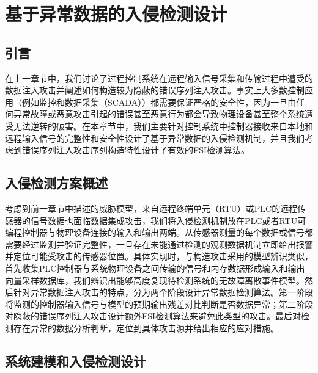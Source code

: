 
\chapter{基于异常数据的入侵检测设计}
\label{chap:data detection}

\section{引言}
\label{sec:intro}

在上一章节中，我们讨论了过程控制系统在远程输入信号采集和传输过程中遭受的数据注入攻击并阐述如何构造较为隐蔽的错误序列注入攻击。事实上大多数控制应用（例如监控和数据采集（SCADA））都需要保证严格的安全性，因为一旦由任何异常故障或恶意攻击引起的错误甚至恶意行为都会导致物理设备甚至整个系统遭受无法逆转的破害。在本章节中，我们主要针对控制系统中控制器接收来自本地和远程输入信号的完整性和安全性设计了基于异常数据的入侵检测机制，并且我们考虑到错误序列注入攻击序列构造特性设计了有效的FSI检测算法。

\section{入侵检测方案概述}
\label{sec:list}

考虑到前一章节中描述的威胁模型，来自远程终端单元（RTU）或PLC的远程传感器的信号数据也面临数据集成攻击，我们将入侵检测机制放在PLC或者RTU可编程控制器与物理设备连接的输入和输出两端。从传感器测量的每个数据或信号都需要经过监测并验证完整性，一旦存在未能通过检测的观测数据机制立即给出报警并定位可能受攻击的传感器位置。具体实现时，与构造攻击采用的模型辨识类似，首先收集PLC控制器与系统物理设备之间传输的信号和内存数据形成输入和输出向量采样数据库，我们辨识出能够高度复现待检测系统的无故障离散事件模型。然后针对异常数据注入攻击的特点，分为两个阶段设计异常数据检测算法。第一阶段将监测的控制器输入信号与模型的预期输出残差对比判断是否数据异常；第二阶段对隐蔽的错误序列注入攻击设计额外FSI检测算法来避免此类型的攻击。最后对检测存在异常的数据分析判断，定位到具体攻击源并给出相应的应对措施。



\section{系统建模和入侵检测设计}
\label{sec:matheq}

